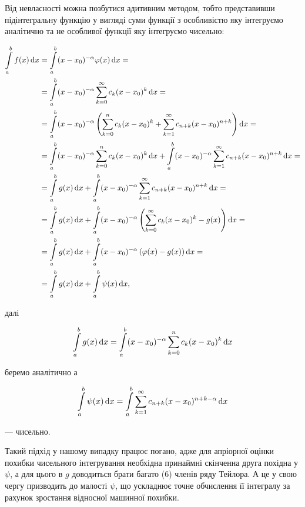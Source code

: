 Від невласності можна позбутися адитивним методом, тобто представивши підінтегральну функцію у вигляді суми функції з особливістю яку інтегруємо аналітично та не особливої функції яку інтегруємо чисельно:

\begin{align*}
	\Int_{a}^{b} f(x) \diff x &= \Int_{a}^{b} (x - x_0)^{-\alpha} \varphi(x) \diff x = \\
	&= \Int_{a}^{b} (x - x_0)^{-\alpha} \Sum_{k = 0}^\infty c_k (x - x_0)^k \diff x = \\
	&= \Int_{a}^{b} (x - x_0)^{-\alpha} \left( \Sum_{k = 0}^n c_k (x - x_0)^k + \Sum_{k = 1}^\infty c_{n + k} (x - x_0)^{n + k} \right) \diff x = \\
	&= \Int_{a}^{b} (x - x_0)^{-\alpha} \Sum_{k = 0}^n c_k (x - x_0)^k \diff x + \Int_{a}^{b} (x - x_0)^{-\alpha} \Sum_{k = 1}^\infty c_{n + k} (x - x_0)^{n + k} \diff x = \\
	&= \Int_{a}^{b} g(x) \diff x + \Int_{a}^{b} (x - x_0)^{-\alpha} \Sum_{k = 1}^\infty c_{n + k} (x - x_0)^{n + k} \diff x = \\
	&= \Int_{a}^{b} g(x) \diff x + \Int_{a}^{b} (x - x_0)^{-\alpha} \left( \Sum_{k = 0}^\infty c_{k} (x - x_0)^{k} - g(x) \right) \diff x = \\
	&= \Int_{a}^{b} g(x) \diff x + \Int_{a}^{b} (x - x_0)^{-\alpha} \left( \phi(x) - g(x) \right) \diff x = \\
	&= \Int_{a}^{b} g(x) \diff x + \Int_{a}^{b} \psi(x) \diff x,
\end{align*}

далі 

\begin{equation}
	\displaystyle\int\limits_{a}^{b} g(x) \mathop{}\!\mathrm{d} x = \displaystyle\int\limits_{a}^{b} (x - x_0)^{-\alpha} \displaystyle\sum\limits_{k = 0}^n c_k (x - x_0)^k \mathop{}\!\mathrm{d} x
\end{equation}

беремо аналітично а

\begin{equation}
	\displaystyle\int\limits_{a}^{b} \psi(x) \mathop{}\!\mathrm{d} x = \displaystyle\int\limits_{a}^{b} \displaystyle\sum\limits_{k = 1}^{\infty} c_{n + k} (x - x_0)^{n + k - \alpha} \mathop{}\!\mathrm{d} x
\end{equation}

--- чисельно. \medskip

Такий підхід у нашому випадку працює погано, адже для апріорної оцінки похибки чисельного інтегрування необхідна принаймні скінченна друга похідна у $\psi$, а для цього в $g$ доводиться брати багато (6) членів ряду Тейлора. А це у свою чергу призводить до малості $\psi$, що ускладнює точне обчислення її інтегралу за рахунок зростання відносної машинної похибки. \medskip

